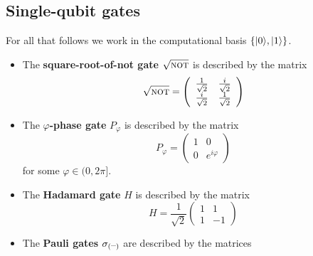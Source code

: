 \documentclass[10pt]{article}
\DeclarePairedDelimiter\ket{\lvert}{\rangle}
\newcommand{\blank}{\hbox{--}}
\begin{document}
        \subsection{Single-qubit gates}

            For all that follows we work in the computational basis $\{\ket{0},\ket{1}\}$.

            \begin{itemize}
                \item The \textbf{square-root-of-{\sc not} gate} $\sqrt{\text{\sc{not}}}$ is described by the matrix
                    \begin{equation*}
                        \sqrt{\text{\sc{not}}}=\left(
                            \begin{array}{cc}
                                \frac{1}{\sqrt{2}} & \frac{i}{\sqrt{2}}\\
                                \frac{i}{\sqrt{2}} & \frac{1}{\sqrt{2}}
                            \end{array}
                        \right)
                    \end{equation*}
                \item The \textbf{$\varphi$-phase gate} $P_\varphi$ is described by the matrix
                    \begin{equation*}
                        P_\varphi=\left(
                            \begin{array}{cc}
                                1&0\\
                                0&e^{i\varphi}
                            \end{array}
                        \right)
                    \end{equation*}
                    for some $\varphi\in(0,2\pi]$.
                \item The \textbf{Hadamard gate} $H$ is described by the matrix
                    \begin{equation*}
                        H=\frac{1}{\sqrt{2}}\left(
                            \begin{array}{cc}
                                1&1\\
                                1&-1
                            \end{array}
                        \right)
                    \end{equation*}
                \item The \textbf{Pauli gates} $\sigma_{(\blank)}$ are described by the matrices

\end{itemize}
\end{document}
